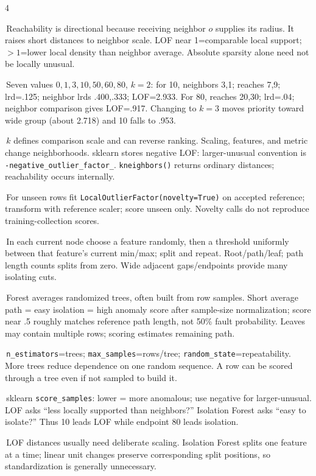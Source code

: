 \documentclass[10pt]{article}
\newcommand{\topic}[1]{\vspace{1.2pt}{\color{blue}\bfseries\fontsize{5.8}{6.0}\selectfont #1}\par\vspace{0.2pt}}
\newcommand{\code}[1]{\texttt{#1}}
\newcommand{\bitem}{\par\hangindent=0.08in\hangafter=1\textbullet\,}
\begin{document}
\begin{multicols*}{4}
\bitem Reachability is directional because receiving neighbor $o$ supplies its radius. It raises short distances to neighbor scale. LOF near 1=comparable local support; $>1$=lower local density than neighbor average. Absolute sparsity alone need not be locally unusual.
\bitem Seven values $0,1,3,10,50,60,80$, $k=2$: for 10, neighbors 3,1; reaches 7,9; lrd=.125; neighbor lrds .400,.333; LOF=2.933. For 80, reaches 20,30; lrd=.04; neighbor comparison gives LOF=.917. Changing to $k=3$ moves priority toward wide group (about 2.718) and 10 falls to .953.
\bitem $k$ defines comparison scale and can reverse ranking. Scaling, features, and metric change neighborhoods. sklearn stores negative LOF: larger-unusual convention is \code{-negative\_outlier\_factor\_}. \code{kneighbors()} returns ordinary distances; reachability occurs internally.
\bitem For unseen rows fit \code{LocalOutlierFactor(novelty=True)} on accepted reference; transform with reference scaler; score unseen only. Novelty calls do not reproduce training-collection scores.

\topic{ISOLATION FOREST}
\bitem In each current node choose a feature randomly, then a threshold uniformly between that feature's current min/max; split and repeat. Root/path/leaf; path length counts splits from zero. Wide adjacent gaps/endpoints provide many isolating cuts.
\bitem Forest averages randomized trees, often built from row samples. Short average path = easy isolation = high anomaly score after sample-size normalization; score near .5 roughly matches reference path length, not 50\% fault probability. Leaves may contain multiple rows; scoring estimates remaining path.
\bitem \code{n\_estimators}=trees; \code{max\_samples}=rows/tree; \code{random\_state}=repeatability. More trees reduce dependence on one random sequence. A row can be scored through a tree even if not sampled to build it.
\bitem sklearn \code{score\_samples}: lower = more anomalous; use negative for larger-unusual. LOF asks ``less locally supported than neighbors?'' Isolation Forest asks ``easy to isolate?'' Thus 10 leads LOF while endpoint 80 leads isolation.
\bitem LOF distances usually need deliberate scaling. Isolation Forest splits one feature at a time; linear unit changes preserve corresponding split positions, so standardization is generally unnecessary.


\end{multicols*}
\end{document}
